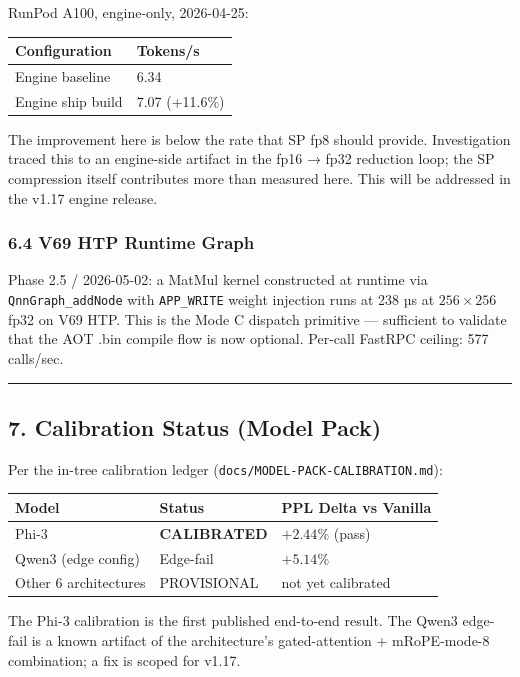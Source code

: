 \documentclass[
  11pt,
]{article}
\begin{document}
RunPod A100, engine-only, 2026-04-25:

\begin{longtable}[]{@{}ll@{}}
\toprule
Configuration & Tokens/s\tabularnewline
\midrule
\endhead
Engine baseline & 6.34\tabularnewline
Engine ship build & 7.07 (+11.6\%)\tabularnewline
\bottomrule
\end{longtable}

The improvement here is below the rate that SP fp8 should provide.
Investigation traced this to an engine-side artifact in the fp16 → fp32
reduction loop; the SP compression itself contributes more than measured
here. This will be addressed in the v1.17 engine release.

\hypertarget{v69-htp-runtime-graph}{%
\subsubsection{6.4 V69 HTP Runtime Graph}\label{v69-htp-runtime-graph}}

Phase 2.5 / 2026-05-02: a MatMul kernel constructed at runtime via
\texttt{QnnGraph\_addNode} with \texttt{APP\_WRITE} weight injection
runs at 238 µs at \(256 \times 256\) fp32 on V69 HTP. This is the Mode C
dispatch primitive --- sufficient to validate that the AOT .bin compile
flow is now optional. Per-call FastRPC ceiling: 577 calls/sec.

\begin{center}\rule{0.5\linewidth}{0.5pt}\end{center}

\hypertarget{calibration-status-model-pack}{%
\subsection{7. Calibration Status (Model
Pack)}\label{calibration-status-model-pack}}

Per the in-tree calibration ledger
(\texttt{docs/MODEL-PACK-CALIBRATION.md}):

\begin{longtable}[]{@{}lll@{}}
\toprule
Model & Status & PPL Delta vs Vanilla\tabularnewline
\midrule
\endhead
Phi-3 & \textbf{CALIBRATED} & \(+2.44\%\) (pass)\tabularnewline
Qwen3 (edge config) & Edge-fail & \(+5.14\%\)\tabularnewline
Other 6 architectures & PROVISIONAL & not yet calibrated\tabularnewline
\bottomrule
\end{longtable}

The Phi-3 calibration is the first published end-to-end result. The
Qwen3 edge-fail is a known artifact of the architecture's
gated-attention + mRoPE-mode-8 combination; a fix is scoped for v1.17.
\end{document}
